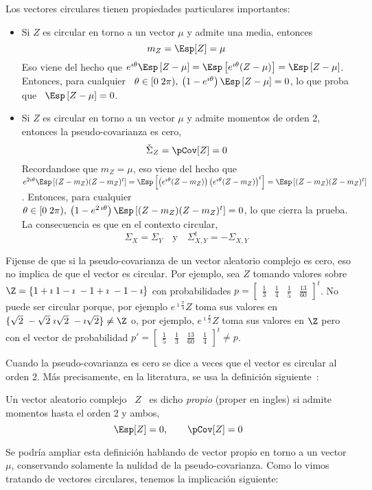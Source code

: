 Los vectores circulares tienen propiedades particulares importantes:
%
\begin{itemize}
\item  Si $Z$  es circular  en torno a  un vector  $\mu$ y  admite una  media,
  entonces
  \[
  m_Z = \Esp[Z] = \mu
  \]
  Eso  viene del  hecho que  $e^{\imath  \theta} \Esp\left[  Z -  \mu \right]  =
  \Esp\left[  e^{\imath  \theta}  (Z  -  \mu)  \right]  =  \Esp\left[  Z  -  \mu
  \right]$. Entonces,  para cualquier \ $\theta \in  [0 \; 2 \pi),  \: \left(1 -
    e^{\imath \theta} \right) \Esp\left[ Z -  \mu \right] = 0$, lo que proba que
  \ $\Esp\left[ Z - \mu \right] = 0$.
%
\item Si $Z$ es circular en torno a un vector $\mu$ y admite momentos de orden
  2, entonces la pseudo-covarianza es  cero,
  \[
  \check{\Sigma}_Z = \pCov[Z] = 0
  \]
  Recordandose que $m_Z = \mu$, eso  viene del hecho que $e^{2 \imath \theta}
  \Esp\left[ (Z - m_Z) (Z - m_Z)^t \right] = \Esp\left[ \left( e^{\imath \theta}
      (Z - m_Z)  \right) \left( e^{\imath \theta} (Z -  m_Z) \right)^t \right] =
  \Esp\left[ (Z - m_Z) (Z - m_Z)^t \right]$.  Entonces, para cualquier \ $\theta
  \in [0 \; 2 \pi), \: \left(1  - e^{2 \, \imath \theta} \right) \Esp\left[ (Z -
    m_Z) (Z - m_Z)^t  \right] = 0$, lo que cierra la  prueba. La consecuencia es
  que en el contexto circular,
  \[
  \Sigma_X = \Sigma_Y \quad \mbox{y} \quad \Sigma_{X,Y}^t = - \Sigma_{X,Y}
  \]
\end{itemize}

Fijense de que si la pseudo-covarianza  de un vector aleatorio complejo es cero,
eso  no implica de  que el  vector es  circular.  Por  ejemplo, sea  $Z$ tomando
valores sobre  $\Z = \{ 1+\imath \;  1-\imath \; -1+\imath \;  -1-\imath \}$ con
probabilidades   $p  =   \begin{bmatrix}   \frac13  &   \frac14   &  \frac15   &
  \frac{13}{60}  \end{bmatrix}^t$. No  puede  ser circular  porque, por  ejemplo
$e^{\imath \frac{\pi}{4}} Z$ toma sus valores en $\{ \sqrt2 \; -\sqrt2 \; \imath
\sqrt2 \; -\imath \sqrt2 \} \ne \Z$ o, por ejemplo, $e^{\imath \frac{\pi}{2}} Z$
toma   sus  valores   en  $\Z$   pero  con   el  vector   de   probabilidad  $p'
= \begin{bmatrix} \frac15 & \frac13 & \frac{13}{60} & \frac14\end{bmatrix}^t \ne
p$.

Cuando la pseudo-covarianza es cero se dice a veces que el vector es circular al
orden  2.  M\'as  precisamente,  en   la  literatura,  se  usa  la  definici\'on
siguiente~\cite[Def.~17.4.1]{Lap17}:
%
\begin{definicion}\label{Def:MP:VectorAleatorioComplejoPropio}
%
  Un vector aleatorio complejo \ $Z$  \ es dicho {\em propio} (proper en ingles)
  si admite momentos hasta el orden 2 y ambos,
  \[
  \Esp[Z] = 0, \qquad \pCov[Z] = 0
  \]
\end{definicion}
%
Se podr\'ia ampliar  esta definici\'on hablando de vector propio  en torno a un
vector $\mu$, conservando solamente la  nulidad de la pseudo-covarianza. Como lo
vimos tratando de vectores circulares, tenemos la implicaci\'on siguiente:

